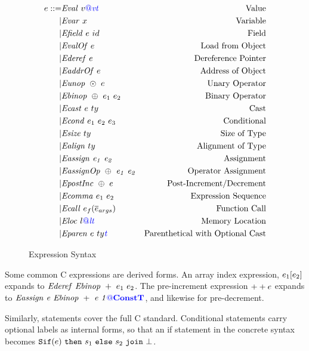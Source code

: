 \documentclass{llncs}
\begin{document}
\begin{figure}
  \[\begin{aligned}
  e ::= & \mathit{Eval} ~ v{\color{blue} @}\mathit{\color{blue} vt} & \textnormal{Value} \\
  | & \mathit{Evar} ~ x & \textnormal{Variable} \\
  | & \mathit{Efield} ~ e ~ id & \textnormal{Field} \\
  | & \mathit{EvalOf} ~ e & \textnormal{Load from Object} \\
  | & \mathit{Ederef} ~ e & \textnormal{Dereference Pointer} \\
  | & \mathit{EaddrOf} ~ e & \textnormal{Address of Object} \\
  | & \mathit{Eunop} ~ \odot ~ e & \textnormal{Unary Operator} \\
  | & \mathit{Ebinop} ~ \oplus ~ e_1 ~ e_2 & \textnormal{Binary Operator} \\
  | & \mathit{Ecast} ~ e ~ ty & \textnormal{Cast} \\
  | & \mathit{Econd} ~ e_1 ~ e_2 ~ e_3 & \textnormal{Conditional} \\
  | & \mathit{Esize} ~ ty & \textnormal{Size of Type} \\
  | & \mathit{Ealign} ~ ty & \textnormal{Alignment of Type} \\
  | & \mathit{Eassign ~ e_1 ~ e_2} & \textnormal{Assignment} \\
  | & \mathit{EassignOp ~ \oplus ~ e_1 ~ e_2} & \textnormal{Operator Assignment} \\
  | & \mathit{EpostInc} ~ \oplus ~ e & \textnormal{Post-Increment/Decrement} \\
  | & \mathit{Ecomma} ~ e_1 ~ e_2 & \textnormal{Expression Sequence} \\
  | & \mathit{Ecall} ~ e_f(\overline{e}_{args}) & \textnormal{Function Call} \\
  | & \mathit{Eloc} ~ l{\color{blue} @}\mathit{\color{blue} lt} & \textnormal{Memory Location} \\
  | & \mathit{Eparen} ~ e ~ ty{\mathit{\color{blue} t}} & \textnormal{Parenthetical with Optional Cast} \\
  \end{aligned}\]
  \caption{Expression Syntax}
  \label{fig:expr}
\end{figure}

Some common C expressions are derived forms. An array index expression,
\(e_1[e_2]\) expands to \(\mathit{Ederef} ~ \mathit{Ebinop} ~ + ~ e_1 ~ e_2\).
The pre-increment  expression \(++e\) expands to
\(\mathit{Eassign ~ e ~ \mathit{Ebinop} ~ + ~ e ~ 1{\color{blue} @}\color{blue} \mathbf{ConstT}}\), and likewise for pre-decrement.

Similarly, statements cover the full C standard. Conditional statements
carry optional labels as internal forms, so that an if statement in the
concrete syntax becomes \(\mathtt{Sif}(e) ~ \mathtt{then} ~ s_1 ~ \mathtt{else} ~ s_2 ~ \mathtt{join} ~ \bot\).
\end{document}
